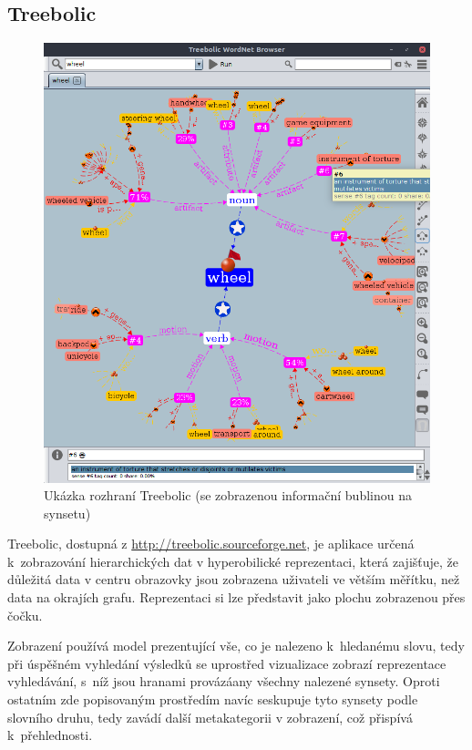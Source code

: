 \documentclass[a4paper, 11pt, oneside, showtrims]{book}
\begin{document}
				\subsection{Treebolic}

					\begin{figure}[ht]
						\centering
						\includegraphics[width=1.0\textwidth]{wntreebolic.png}
						\caption{Ukázka rozhraní Treebolic (se zobrazenou informační bublinou na synsetu)}
						\label{fig:wntreebolic}
					\end{figure}

					Treebolic, dostupná z \url{http://treebolic.sourceforge.net}, je aplikace určená k~zobrazování hierarchických dat v hyperobilické reprezentaci, která zajišťuje, že důležitá data v centru obrazovky jsou zobrazena uživateli ve větším měřítku, než data na okrajích grafu. Reprezentaci si lze představit jako plochu zobrazenou přes čočku. \parencite{boutreebolic}

					Zobrazení používá model prezentující vše, co je nalezeno k~hledanému slovu, tedy při úspěšném vyhledání výsledků se uprostřed vizualizace zobrazí reprezentace vyhledávání, s~níž jsou hranami provázáany všechny nalezené synsety. Oproti ostatním zde popisovaným prostředím navíc seskupuje tyto synsety podle slovního druhu, tedy zavádí další metakategorii v zobrazení, což přispívá k~přehlednosti. 
\end{document}
